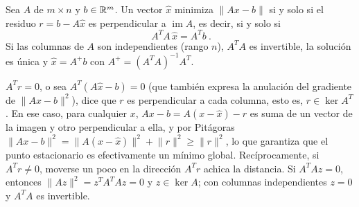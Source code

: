 \begin{proposicion}\label{prop:ecuaciones-normales}
Sea \(A\) de \(m\times n\) y \(b\in\mathbb{R}^m\). Un vector \(\hat x\) minimiza
\(\lVert Ax-b\rVert\) si y solo si el residuo \(r=b-A\hat x\) es perpendicular a
\(\operatorname{im}A\), es decir, si y solo si
\[
  \boxed{\ A^TA\,\hat x=A^Tb\ } .
\]
Si las columnas de \(A\) son independientes (rango \(n\)), \(A^TA\) es invertible, la
solución es única y \(\hat x=A^{+}b\) con \(A^{+}=(A^TA)^{-1}A^T\).
\end{proposicion}

\begin{demostracion}
\(A^Tr=0\), o sea \(A^T(A\hat x-b)=0\) (que también expresa la anulación del gradiente de \(\lVert Ax-b\rVert^2\)), dice que \(r\) es perpendicular a cada columna, esto es, \(r\in\ker A^T\). En
ese caso, para cualquier \(x\),
\(Ax-b=A(x-\hat x)-r\) es suma de un vector de la imagen y otro perpendicular a ella, y por
Pitágoras \(\lVert Ax-b\rVert^2=\lVert A(x-\hat x)\rVert^2+\lVert r\rVert^2\ge\lVert r\rVert^2\), lo que garantiza que el punto estacionario es efectivamente un mínimo global.
Recíprocamente, si \(A^Tr\neq0\), moverse un poco en la dirección \(A^Tr\) achica la
distancia. Si \(A^TAz=0\), entonces \(\lVert Az\rVert^2=z^TA^TAz=0\) y \(z\in\ker A\); con
columnas independientes \(z=0\) y \(A^TA\) es invertible.
\end{demostracion}


